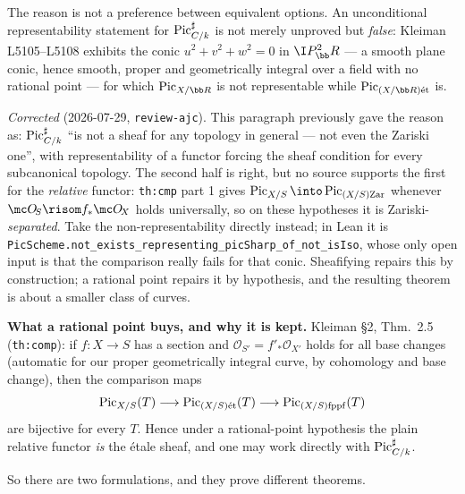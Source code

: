 The reason is not a preference between equivalent options. An unconditional
representability statement for \(\operatorname{Pic}^\sharp_{C/k}\) is not merely unproved but
\emph{false}: Kleiman L5105--L5108 exhibits the conic \(u^2+v^2+w^2=0\) in
\(\I P^2_\bb R\) --- a smooth plane conic, hence smooth, proper and geometrically
integral over a field with no rational point --- for which \(\Pic_{X/\bb R}\) is
not representable while \(\Pic_{(X/\bb R)\et}\) is.

\emph{Corrected} (2026-07-29, \texttt{review-ajc}). This paragraph previously gave
the reason as: \(\operatorname{Pic}^\sharp_{C/k}\) ``is not a sheaf for any topology in general
--- not even the Zariski one'', with representability of a functor forcing the
sheaf condition for every subcanonical topology. The second half is right, but no
source supports the first for the \emph{relative} functor: \texttt{th:cmp} part 1
gives \(\Pic_{X/S}\into\Pic_{(X/S)\zar}\) whenever
\(\mc O_{\!S}\risom f_*\mc O_{\!X}\) holds universally, so on these hypotheses it
is Zariski-\emph{separated}. Take the non-representability directly instead; in
Lean it is
\texttt{PicScheme.not\_exists\_representing\_picSharp\_of\_not\_isIso}, whose only
open input is that the comparison really fails for that conic. Sheafifying repairs this by construction; a rational point repairs
it by hypothesis, and the resulting theorem is about a smaller class of curves.

\medskip

\textbf{What a rational point buys, and why it is kept.} Kleiman \S 2, Thm.~2.5
(\texttt{th:comp}): if \(f : X \to S\) has a section
and \(\mathcal O_{S'} = f'_* \mathcal O_{X'}\) holds for all base changes
(automatic for our proper geometrically integral curve, by cohomology and
base change), then the comparison maps
\[
  \operatorname{Pic}_{X/S}(T) \longrightarrow \operatorname{Pic}_{(X/S)\mathrm{\acute{e}t}}(T) \longrightarrow
  \operatorname{Pic}_{(X/S)\mathrm{fppf}}(T)
\]
are bijective for every \(T\). Hence under a rational-point hypothesis the
plain relative functor \emph{is} the \'etale sheaf, and one may work directly
with \(\operatorname{Pic}^\sharp_{C/k}\).

So there are two formulations, and they prove different theorems.

